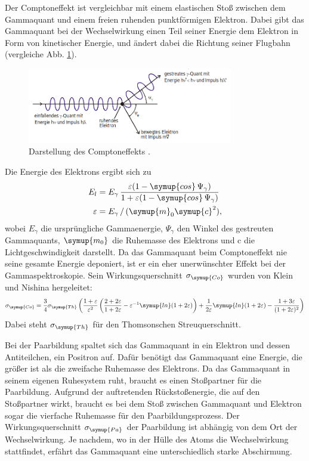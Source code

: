     Der Comptoneffekt ist vergleichbar mit einem elastischen Stoß zwischen
    dem Gammaquant und einem freien ruhenden punktförmigen Elektron. Dabei gibt das Gammaquant
    bei der Wechselwirkung einen Teil seiner Energie dem Elektron in Form von kinetischer Energie, und
    ändert dabei die Richtung seiner Flugbahn (vergleiche Abb. \ref{fig:compton_skizze}).
    \begin{figure}
      \centering
      \includegraphics[width=0.8\textwidth]{compton_skizze.png}
      \caption{Darstellung des Comptoneffekts \cite{anleitungv18}.}
      \label{fig:compton_skizze}
    \end{figure}
    Die Energie des Elektrons ergibt sich zu
    \begin{align}
      E_l &= E_\gamma \,\frac{\varepsilon(1-\symup{cos}\,\Psi_\gamma)}{1+\varepsilon(1-\symup{cos}\,\Psi_\gamma)}\\
      \varepsilon &= E_\gamma\,/\,(\symup{m}_0 \symup{c}^2),
    \end{align}
    wobei $E_\gamma$ die ursprüngliche Gammaenergie, $\Psi_\gamma$ den Winkel des gestreuten Gammaquants,
    $\symup{m_0}$ die Ruhemasse des Elektrons und c die Lichtgeschwindigkeit darstellt.
    Da das Gammaquant beim Comptoneffekt nie seine gesamte Energie deponiert, ist er ein
    eher unerwünschter Effekt bei der Gammaspektroskopie. Sein Wirkungsquerschnitt $\sigma_{\symup{Co}}$ wurden von
    Klein und Nishina hergeleitet:
    \begin{align}
      \sigma_{\symup{Co}} = \frac{3}{4}\sigma_{\symup{Th}}\left(\frac{1+\varepsilon}{\varepsilon^2}\left(\frac{2+2\varepsilon}{1+2\varepsilon}-\varepsilon^{-1}\symup{ln}(1+2\varepsilon)\right)
      + \frac{1}{2\varepsilon}\symup{ln}(1+2\varepsilon) - \frac{1+3\varepsilon}{(1+2\varepsilon)^2}\right)
    \end{align}
    Dabei steht $\sigma_{\symup{Th}}$ für den Thomsonschen Streuquerschnitt.

    Bei der Paarbildung spaltet sich das Gammaquant in ein Elektron und dessen Antiteilchen, ein Positron auf.
    Dafür benötigt das Gammaquant eine Energie, die größer ist als die zweifache Ruhemasse des Elektrons.
    Da das Gammaquant in seinem eigenen Ruhesystem ruht, braucht es einen Stoßpartner für die Paarbildung.
    Aufgrund der auftretenden Rückstoßenergie, die auf den Stoßpartner wirkt, braucht es bei dem Stoß zwischen
    Gammaquant und Elektron sogar die vierfache Ruhemasse für den Paarbildungsprozess.
    Der Wirkungsquerschnitt $\sigma_{\symup{Pa}}$ der Paarbildung ist abhängig von dem Ort der Wechselwirkung.
    Je nachdem, wo in der Hülle des Atoms die Wechselwirkung stattfindet, erfährt das Gammaquant eine unterschiedlich
    starke Abschirmung.

